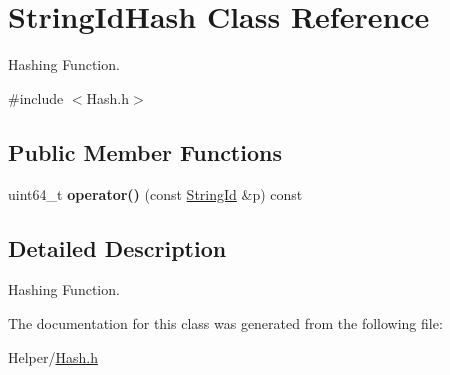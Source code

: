 \hypertarget{classStringIdHash}{}\section{String\+Id\+Hash Class Reference}
\label{classStringIdHash}


Hashing Function.  




{\ttfamily \#include $<$Hash.\+h$>$}

\subsection*{Public Member Functions}
\begin{DoxyCompactItemize}
\item 
\mbox{\label{classStringIdHash_a1d8ae6cf8921d71ca42a31ee8f89356f}} 
uint64\+\_\+t {\bfseries operator()} (const \hyperlink{classStringId}{String\+Id} \&p) const
\end{DoxyCompactItemize}


\subsection{Detailed Description}
Hashing Function. 

The documentation for this class was generated from the following file\+:\begin{DoxyCompactItemize}
\item 
Helper/\hyperlink{Hash_8h}{Hash.\+h}\end{DoxyCompactItemize}
